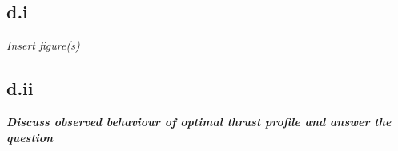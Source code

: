 \documentclass{report}
\begin{document}
\subsection*{d.i}

\textit{Insert figure(s)}

\subsection*{d.ii}

\textbf{\textit{Discuss observed behaviour of optimal thrust profile and answer the question}}











\end{document}
